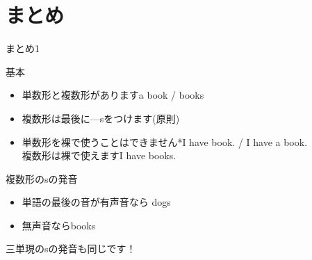 \documentclass[aspectratio=169,xcolor={dvipsnames,table}]{beamer}
\begin{document}
\section{まとめ}
\begin{frame}[plain]{まとめ1}
  \begin{block}{基本}\small
    \begin{itemize}[square]
      \item  単数形と複数形があります\hfill{}a book / books
      \item 複数形は最後に---sをつけます(原則)
      \item  単数形を裸で使うことはできません\hfill{}*I have book. / I have a book.\,\,\dbend\\
            複数形は裸で使えます\hfill{}I have books.\,\phantom{\dbend}\mbox{}
    \end{itemize}
  \end{block}

  \pause

  \begin{block}{複数形のsの発音}\small
    \begin{itemize}[square]
      \item 単語の最後の音が有声音なら\,\,\dbend\hfill{}dogs 
      \item \phantom{単語の最後の音が}無声音なら\hfill{}books 
    \end{itemize}
  \end{block}
  \hfill{\scriptsize 三単現のsの発音も同じです！}
\end{frame}
\end{document}
